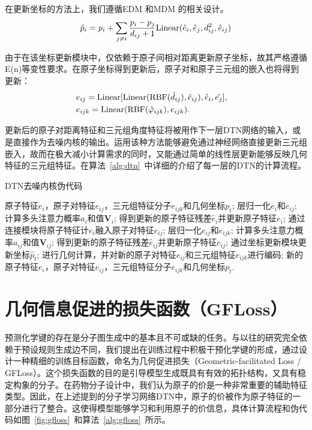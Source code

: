 在更新坐标的方法上，我们遵循EDM \cite{edm_hoogeboom_22}和MDM \cite{mdm_huang_23}的相关设计。
\begin{equation}
    \hat{p}_i = p_i + \sum_{j \neq i} \frac{p_i - p_j}{d_{ij} + 1} {\rm Linear}(\hat{e}_i, \hat{e}_j, d_{ij}^2, \hat{e}_{ij})
\end{equation}

由于在该坐标更新模块中，仅依赖于原子间相对距离更新原子坐标，故其严格遵循E(n)等变性要求。在原子坐标得到更新后，原子对和原子三元组的嵌入也将得到更新：
\begin{eqnarray}
  &e_{ij} = {\rm Linear}[{\rm Linear}({\rm RBF}(\hat{d}_{ij}), \hat{e}_{ij}), \hat{e}_i, \hat{e_j}],& \\
  &e_{ijk} = {\rm Linear}({\rm RBF}(\hat{\varphi}_{ijk}), e_{ijk}). &
\end{eqnarray}

更新后的原子对距离特征和三元组角度特征将被用作下一层DTN网络的输入，或是直接作为去噪内核的输出。运用该种方法能够避免通过神经网络直接更新三元组嵌入，故而在极大减小计算需求的同时，又能通过简单的线性层更新能够反映几何特征的三元组特征。在算法~\ref{alg:dtn}~中详细的介绍了每一层的DTN的计算流程。

\begin{algorithm}[H]
    \caption{DTN去噪内核伪代码}
    \label{alg:dtn}
    \begin{algorithmic}
     原子特征$e_i$，原子对特征$e_{ij}$，三元组特征分子$e_{ijk}$和几何坐标$p_t$;
    \STATE 层归一化$e_i$和$e_{ij}$;
    \STATE 计算多头注意力概率$a_i$和值$\mathbf{V}_i$;
    \STATE 得到更新的原子特征残差$\hat{e}_i$并更新原子特征$e_i$;
    \STATE 通过连接模块将原子特征计$e_i$融入原子对特征$e_{ij}$;
    \STATE 层归一化$e_{ij}$和$e_{ijk}$;
    \STATE 计算多头注意力概率$a_{ij}$和值$\mathbf{V}_{ij}$;
    \STATE 得到更新的原子特征残差$\hat{e}_{ij}$并更新原子特征$e_{ij}$;
    \STATE 通过坐标更新模块更新坐标$\hat{p}_t$;
    \STATE 进行几何计算，并对新的原子对特征$e_{ij}$和三元组特征$e_{ijk}$进行编码;
     新的原子特征$e_i$，原子对特征$e_{ij}$，三元组特征分子$e_{ijk}$和几何坐标$p_t$.
    \end{algorithmic}
\end{algorithm}

\section{几何信息促进的损失函数（GFLoss）}
预测化学键的存在是分子图生成中的基本且不可或缺的任务。与以往的研究完全依赖于预设规则生成边不同，我们提出在训练过程中积极干预化学键的形成，通过设计一种精细的训练目标函数，命名为几何促进损失（Geometric-facilitated Loss / GFLoss）。这个损失函数的目的是引导模型生成既具有有效的拓扑结构，又具有稳定构象的分子。在药物分子设计中，我们认为原子的价是一种非常重要的辅助特征类型。因此，在上述提到的分子学习网络DTN中，原子的价被作为原子特征的一部分进行了整合。这使得模型能够学习和利用原子的价信息，具体计算流程和伪代码如图~\ref{fig:gfloss}~和算法~\ref{alg:gfloss}~所示。

